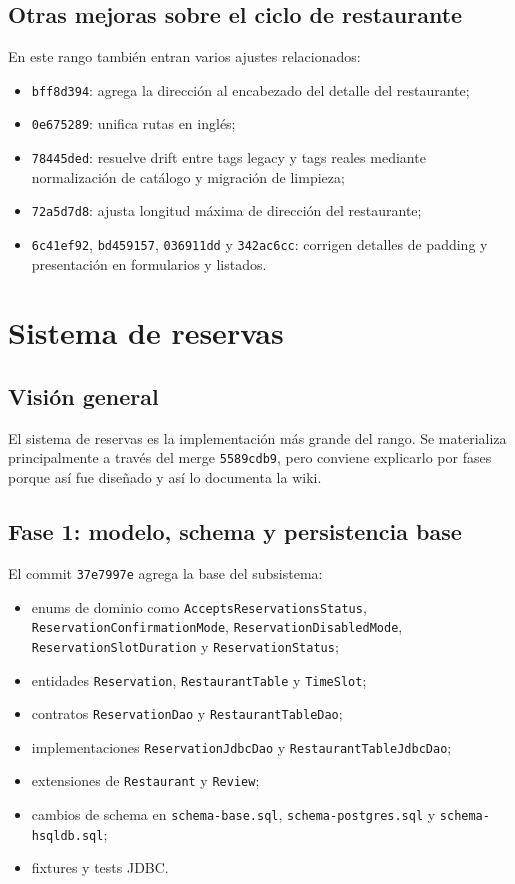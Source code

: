 \documentclass[11pt,a4paper]{report}
\newcommand{\commit}[1]{\texttt{#1}}
\newcommand{\code}[1]{\nolinkurl{#1}}
\begin{document}
\section{Otras mejoras sobre el ciclo de restaurante}

En este rango tambi\'en entran varios ajustes relacionados:

\begin{itemize}
  \item \commit{bff8d394}: agrega la direcci\'on al encabezado del detalle del restaurante;
  \item \commit{0e675289}: unifica rutas en ingl\'es;
  \item \commit{78445ded}: resuelve drift entre tags legacy y tags reales mediante normalizaci\'on de cat\'alogo y migraci\'on de limpieza;
  \item \commit{72a5d7d8}: ajusta longitud m\'axima de direcci\'on del restaurante;
  \item \commit{6c41ef92}, \commit{bd459157}, \commit{036911dd} y \commit{342ac6cc}: corrigen detalles de padding y presentaci\'on en formularios y listados.
\end{itemize}

\chapter{Sistema de reservas}

\section{Visi\'on general}

El sistema de reservas es la implementaci\'on m\'as grande del rango. Se materializa principalmente a trav\'es del merge \commit{5589cdb9}, pero conviene explicarlo por fases porque as\'i fue dise\~nado y as\'i lo documenta la wiki.

\section{Fase 1: modelo, schema y persistencia base}

El commit \commit{37e7997e} agrega la base del subsistema:

\begin{itemize}
  \item enums de dominio como \code{AcceptsReservationsStatus}, \code{ReservationConfirmationMode}, \code{ReservationDisabledMode}, \code{ReservationSlotDuration} y \code{ReservationStatus};
  \item entidades \code{Reservation}, \code{RestaurantTable} y \code{TimeSlot};
  \item contratos \code{ReservationDao} y \code{RestaurantTableDao};
  \item implementaciones \code{ReservationJdbcDao} y \code{RestaurantTableJdbcDao};
  \item extensiones de \code{Restaurant} y \code{Review};
  \item cambios de schema en \code{schema-base.sql}, \code{schema-postgres.sql} y \code{schema-hsqldb.sql};
  \item fixtures y tests JDBC.
\end{itemize}
\end{document}
